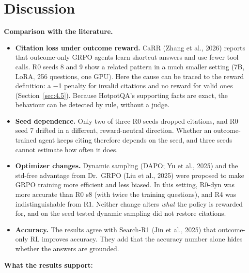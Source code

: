 \section{Discussion}\label{sec:4.8}

\textbf{Comparison with the literature.}

\begin{itemize}
\tightlist
\item
  \textbf{Citation loss under outcome reward.} CaRR (Zhang et al., 2026)
  reports that outcome-only GRPO agents learn shortcut answers and use
  fewer tool calls. R0 seeds 8 and 9 show a related pattern in a much
  smaller setting (7B, LoRA, 256 questions, one GPU). Here the cause can
  be traced to the reward definition: a −1 penalty for invalid citations
  and no reward for valid ones (Section~\ref{sec:4.5}). Because
  HotpotQA's supporting facts are exact, the behaviour can be detected
  by rule, without a judge.
\item
  \textbf{Seed dependence.} Only two of three R0 seeds dropped
  citations, and R0 seed 7 drifted in a different, reward-neutral
  direction. Whether an outcome-trained agent keeps citing therefore
  depends on the seed, and three seeds cannot estimate how often it
  does.
\item
  \textbf{Optimizer changes.} Dynamic sampling (DAPO; Yu et al., 2025)
  and the std-free advantage from Dr.~GRPO (Liu et al., 2025) were
  proposed to make GRPO training more efficient and less biased. In this
  setting, R0-dyn was more accurate than R0 s8 (with twice the training
  questions), and R4 was indistinguishable from R1. Neither change
  alters \emph{what} the policy is rewarded for, and on the seed tested
  dynamic sampling did not restore citations.
\item
  \textbf{Accuracy.} The results agree with Search-R1 (Jin et al., 2025)
  that outcome-only RL improves accuracy. They add that the accuracy
  number alone hides whether the answers are grounded.
\end{itemize}

\textbf{What the results support:}

